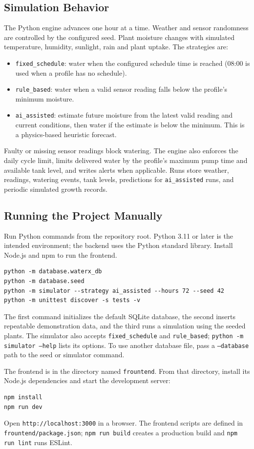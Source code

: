 \documentclass[11pt,a4paper]{article}
\newcommand{\cn}[1]{\texttt{#1}}   %
\begin{document}
\subsection{Simulation Behavior}
The Python engine advances one hour at a time. Weather and sensor randomness
are controlled by the configured seed. Plant moisture changes with simulated
temperature, humidity, sunlight, rain and plant uptake. The strategies are:
\begin{itemize}
  \item \cn{fixed\_schedule}: water when the configured schedule time is reached
        (08:00 is used when a profile has no schedule).
  \item \cn{rule\_based}: water when a valid sensor reading falls below the
        profile's minimum moisture.
  \item \cn{ai\_assisted}: estimate future moisture from the latest valid
        reading and current conditions, then water if the estimate is below
        the minimum. This is a physics-based heuristic forecast.
\end{itemize}
Faulty or missing sensor readings block watering. The engine also enforces
the daily cycle limit, limits delivered water by the profile's maximum pump
time and available tank level, and writes alerts when applicable. Runs store
weather, readings, watering events, tank levels, predictions for
\cn{ai\_assisted} runs, and periodic simulated growth records.

\subsection{Running the Project Manually}
Run Python commands from the repository root. Python 3.11 or later is the
intended environment; the backend uses the Python standard library. Install
Node.js and npm to run the frontend.
\begin{verbatim}
python -m database.waterx_db
python -m database.seed
python -m simulator --strategy ai_assisted --hours 72 --seed 42
python -m unittest discover -s tests -v
\end{verbatim}
The first command initializes the default SQLite database, the second inserts
repeatable demonstration data, and the third runs a simulation using the
seeded plants. The simulator also accepts \cn{fixed\_schedule} and
\cn{rule\_based}; \cn{python -m simulator --help} lists its options. To use
another database file, pass a \cn{--database} path to the seed or simulator
command.

The frontend is in the directory named \cn{frountend}. From that directory,
install its Node.js dependencies and start the development server:
\begin{verbatim}
npm install
npm run dev
\end{verbatim}
Open \cn{http://localhost:3000} in a browser. The frontend scripts are defined
in \cn{frountend/package.json}; \cn{npm run build} creates a production build
and \cn{npm run lint} runs ESLint.
\end{document}
